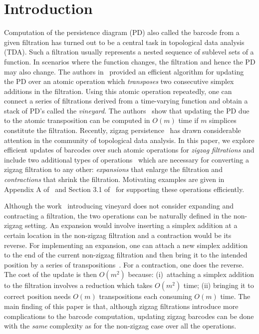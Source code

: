 \documentclass[letterpaper,11pt]{article}
\theoremstyle{mythmstyle}
\theoremstyle{mydefstyle}
\theoremstyle{plain}
\theoremstyle{definition}
\newcommand{\<}[1]{\langle #1\rangle}
\begin{document}
\newpage
\setcounter{page}{1}

\section{Introduction}
\label{sec:intro}




Computation of the persistence diagram (PD) also called the barcode from a given filtration has turned out to
be a central task in topological data analysis (TDA). Such a filtration usually represents
a nested sequence of sublevel sets of a function. In scenarios where the function changes, the filtration and hence the PD may also change. The authors in~\cite{cohen2006vines} provided
an efficient algorithm for updating the PD over an atomic operation which
\emph{transposes} two consecutive simplex additions in the filtration. 
Using this atomic operation repeatedly, one can connect a series of filtrations  derived from a time-varying function 
and obtain a stack of PD's called the
\emph{vineyard}. 
The authors~\cite{cohen2006vines} show that updating the PD due to the atomic transposition can be computed in $O(m)$ time if $m$ simplices constitute the filtration. 
Recently, zigzag persistence~\cite{carlsson2010zigzag,carlsson2009zigzag-realvalue,dey2022fast,dey2023revisiting,kerber2019barcodes,maria2014zigzag,maria2016computing} 
has drawn considerable attention
in the community of topological data analysis.
In this paper, 
we explore efficient updates of barcodes over such atomic operations 
for \emph{zigzag filtrations}
and include two additional types of operations~\cite{dey2021updating} which are necessary for converting
a zigzag filtration to any other: 
\emph{expansions} that enlarge the filtration 
and \emph{contractions} that shrink the filtration.
Motivating examples are given in
Appendix A of~\cite{dey2021updating}
and Section 3.1 of~\cite{tymochko2020using}
for supporting these operations efficiently.


Although the work~\cite{cohen2006vines} introducing vineyard 
does not consider expanding and contracting a filtration, 
the two operations can be naturally defined in the non-zigzag setting.
An expansion would involve inserting a simplex addition at a certain location
in the non-zigzag filtration and a contraction would be its reverse.
For implementing an expansion, one can
attach a new simplex addition to the end of the current non-zigzag filtration 
and then bring it to the intended position by a series of transpositions~\cite{cohen2006vines}.
For a contraction, one does the reverse. 
The cost of the update 
is then $O(m^2)$
because:
(i)~attaching a simplex addition to the filtration
involves a reduction which takes $O(m^2)$ time;
(ii) bringing it to correct position needs $O(m)$ transpositions each consuming
$O(m)$ time. 
The main finding of this paper is that, although zigzag filtrations 
introduce more complications  to the barcode computation, 
updating  zigzag barcodes can be done
with the \emph{same} complexity  as for the non-zigzag 
case over all the operations.
\end{document}
